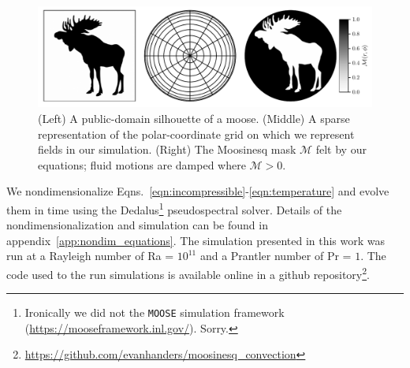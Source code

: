 \begin{figure}[t!]
\centering
\includegraphics[width=\textwidth]{paper_figure01.pdf}
    \caption{ 
        (Left) A public-domain silhouette of a moose.
        (Middle) A sparse representation of the polar-coordinate grid on which we represent fields in our simulation.
        (Right) The Moosinesq mask $\mathcal{M}$ felt by our equations; fluid motions are damped where $\mathcal{M} > 0$.
        \label{fig:methods}
    }
\end{figure}

We nondimensionalize Eqns.~\ref{eqn:incompressible}-\ref{eqn:temperature} and evolve them in time using the Dedalus\footnote{Ironically we did not the \texttt{MOOSE} simulation framework (\url{https://mooseframework.inl.gov/}). Sorry.} \citep{burns_etal_2020} pseudospectral solver.
Details of the nondimensionalization and simulation can be found in appendix~\ref{app:nondim_equations}.
The simulation presented in this work was run at a Rayleigh number of Ra = $10^{11}$ and a Prantler number of Pr = $1$.
The code used to the run simulations is available online in a github repository\footnote{\url{https://github.com/evanhanders/moosinesq_convection}}.
